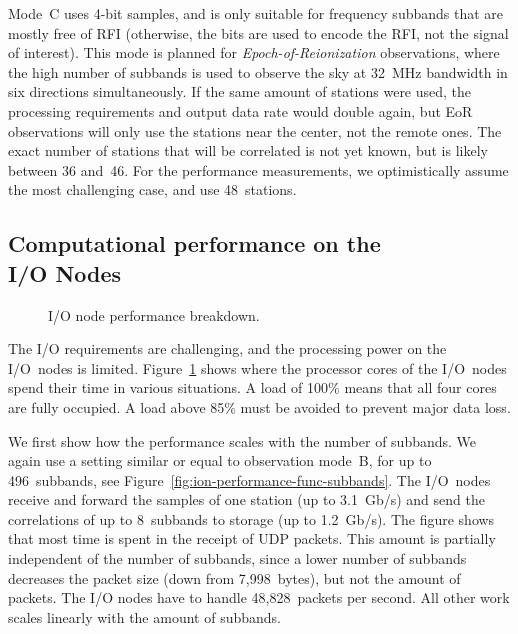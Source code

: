 \documentclass{sig-alternate}
\begin{document}
Mode~\textsf{C} uses 4-bit samples, and is only suitable for frequency
subbands that are mostly free of RFI (otherwise, the bits are used to encode
the RFI, not the signal of interest).
This mode is planned for \emph{Epoch-of-Reionization} observations, where the
high number of subbands is used to observe the sky at 32~MHz bandwidth in six
directions simultaneously.
If the same amount of stations were used, the processing requirements and
output data rate would double again, but EoR observations will only use the
stations near the center, not the remote ones.
The exact number of stations that will be correlated is not yet known, but is
likely between 36 and~46.
For the performance measurements, we optimistically assume the most challenging
case, and use 48~stations.


\subsection{Computational performance on the \\ I/O Nodes}
\label{sec:ION-performance}

\begin{figure}[ht]
\hfill
{}
\caption{I/O node performance breakdown.}
\label{fig:ion-performance}
\end{figure}

The I/O requirements are challenging, and the processing power on the I/O~nodes
is limited.
Figure~\ref{fig:ion-performance} shows where the processor cores of the
I/O~nodes spend their time in various situations.
A load of 100\% means that all four cores are fully occupied.
A load above 85\% must be avoided to prevent major data loss.

We first show how the performance scales with the number of subbands.
We again use a setting similar or equal to observation mode~\textsf{B}, for up
to 496~subbands, see Figure~\ref{fig:ion-performance-func-subbands}.
The I/O~nodes receive and forward the samples
of one station (up to 3.1~Gb/s) and send the correlations of up to 8~subbands
to storage (up to 1.2~Gb/s).
The figure shows that most time is spent in the receipt of UDP packets.
This amount is partially independent of the number of subbands, since a lower
number of subbands decreases the packet size (down from 7,998~bytes), but not
the amount of packets.
The I/O nodes have to handle 48,828~packets per second.
All other work scales linearly with the amount of subbands.
\end{document}
